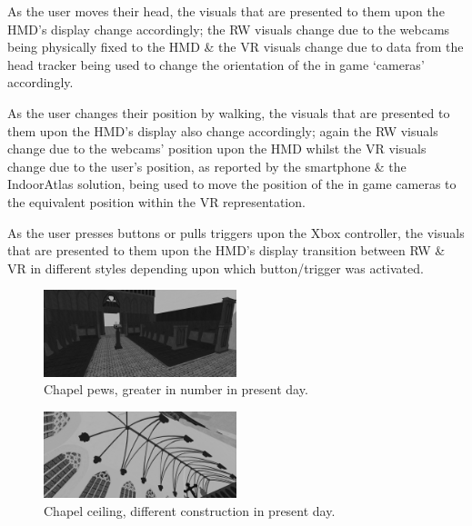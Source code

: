 \documentclass[conference]{acmsiggraph}
\begin{document}
As the user moves their head, the visuals that are presented to them upon the HMD's display change accordingly; the RW visuals change due to the webcams being physically fixed to the HMD \& the VR visuals change due to data from the head tracker being used to change the orientation of the in game `cameras' accordingly.

As the user changes their position by walking, the visuals that are presented to them upon the HMD's display also change accordingly; again the RW visuals change due to the webcams' position upon the HMD whilst the VR visuals change due to the user's position, as reported by the smartphone \& the IndoorAtlas solution, being used to move the position of the in game cameras to the equivalent position within the VR representation.

As the user presses buttons or pulls triggers upon the Xbox controller, the visuals that are presented to them upon the HMD's display transition between RW \& VR in different styles depending upon which button/trigger was activated.

\begin{figure}[h]
	\begin{center}
		\includegraphics[width=0.5\textwidth]{images/pews.png}
		\caption{Chapel pews, greater in number in present day.}
		\label{pews}
	\end{center}	
\end{figure}

\begin{figure}[h]
	\begin{center}
		\includegraphics[width=0.5\textwidth]{images/ceiling.png}
		\caption{Chapel ceiling, different construction in present day.}
		\label{ceiling}
	\end{center}	
\end{figure}

\end{document}
